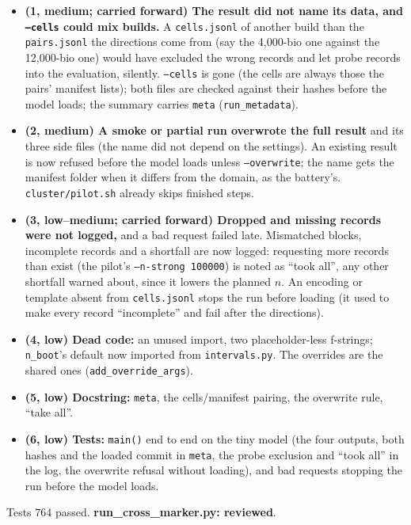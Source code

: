 \documentclass{article}
\begin{document}
\begin{itemize}
  \item \textbf{(1, medium; carried forward) The result did not name its data, and \texttt{--cells} could mix
        builds.} A \texttt{cells.jsonl} of another build than the \texttt{pairs.jsonl} the directions come from
        (say the 4{,}000-bio one against the 12{,}000-bio one) would have excluded the wrong records and let probe
        records into the evaluation, silently. \texttt{--cells} is gone (the cells are always those the pairs'
        manifest lists); both files are checked against their hashes before the model loads; the summary carries
        \texttt{meta} (\texttt{run\_metadata}).
  \item \textbf{(2, medium) A smoke or partial run overwrote the full result} and its three side files (the name did
        not depend on the settings). An existing result is now refused before the model loads unless
        \texttt{--overwrite}; the name gets the manifest folder when it differs from the domain, as the battery's.
        \texttt{cluster/pilot.sh} already skips finished steps.
  \item \textbf{(3, low--medium; carried forward) Dropped and missing records were not logged,} and a bad request
        failed late. Mismatched blocks, incomplete records and a shortfall are now logged: requesting more records
        than exist (the pilot's \texttt{--n-strong 100000}) is noted as ``took all'', any other shortfall warned
        about, since it lowers the planned $n$. An encoding or template absent from \texttt{cells.jsonl} stops the run
        before loading (it used to make every record ``incomplete'' and fail after the directions).
  \item \textbf{(4, low) Dead code:} an unused import, two placeholder-less f-strings; \texttt{n\_boot}'s default
        now imported from \texttt{intervals.py}. The overrides are the shared ones (\texttt{add\_override\_args}).
  \item \textbf{(5, low) Docstring:} \texttt{meta}, the cells/manifest pairing, the overwrite rule, ``take all''.
  \item \textbf{(6, low) Tests:} \texttt{main()} end to end on the tiny model (the four outputs, both hashes and the
        loaded commit in \texttt{meta}, the probe exclusion and ``took all'' in the log, the overwrite refusal without
        loading), and bad requests stopping the run before the model loads.
\end{itemize}
Tests 764 passed. \textbf{run\_cross\_marker.py: reviewed}.
\end{document}
